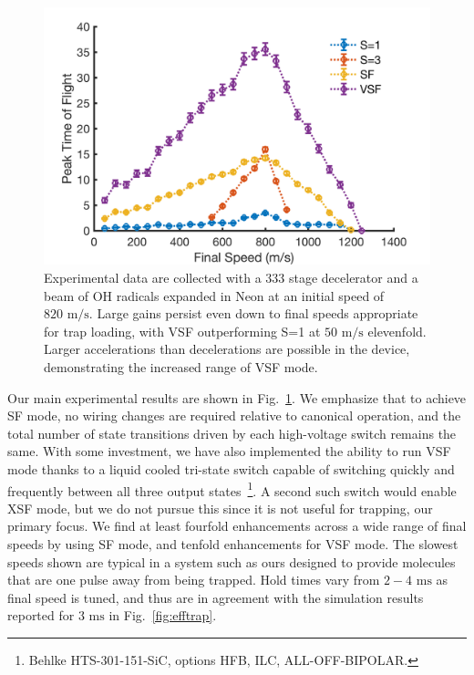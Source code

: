 \documentclass[%
 reprint,
 amsmath,amssymb,
 aps,
prl,
]{revtex4-1}
\begin{document}
\begin{figure}[t]
\includegraphics[width=\linewidth]{Data/Data-Figure-Final-Speed.png}%
\caption{\label{fig:alldata}
Experimental data are collected with a $333$ stage decelerator and a beam of OH radicals expanded in Neon at an initial speed of $820\text{ m/s}$. 
Large gains persist even down to final speeds appropriate for trap loading, with VSF outperforming S=1 at $50\text{ m/s}$ elevenfold.
Larger accelerations than decelerations are possible in the device, demonstrating the increased range of VSF mode. 
}
\end{figure}


Our main experimental results are shown in Fig.~\ref{fig:alldata}.
We emphasize that to achieve SF mode, no wiring changes are required relative to canonical operation, and the total number of state transitions driven by each high-voltage switch remains the same.
With some investment, we have also implemented the ability to run VSF mode thanks to a liquid cooled tri-state switch capable of switching quickly and frequently between all three output states~\footnote{Behlke HTS-301-151-SiC, options HFB, ILC, ALL-OFF-BIPOLAR.}.
A second such switch would enable XSF mode, but we do not pursue this since it is not useful for trapping, our primary focus.
We find at least fourfold enhancements across a wide range of final speeds by using SF mode, and tenfold enhancements for VSF mode.
The slowest speeds shown are typical in a system such as ours designed to provide molecules that are one pulse away from being trapped. 
Hold times vary from $2-4\text{ ms}$ as final speed is tuned, and thus are in agreement with the simulation results reported for $3\text{ ms}$ in Fig.~\ref{fig:efftrap}.
\end{document}
